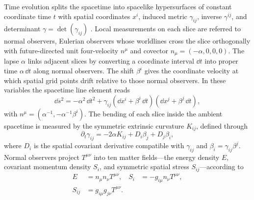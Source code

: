 Time evolution splits the spacetime into spacelike hypersurfaces of constant coordinate time $t$ with spatial coordinates $x^i$, induced metric $\gamma_{ij}$, inverse $\gamma^{ij}$, and determinant $\gamma = \det(\gamma_{ij})$ \cite{Arnowitt:1962hi}. Local measurements on each slice are referred to normal observers, Eulerian observers whose worldlines cross the slice orthogonally with future-directed unit four-velocity $n^\mu$ and covector $n_\mu = (-\alpha, 0, 0, 0)$. The lapse $\alpha$ links adjacent slices by converting a coordinate interval $\dd t$ into proper time $\alpha\,\dd t$ along normal observers. The shift $\beta^i$ gives the coordinate velocity at which spatial grid points drift relative to those normal observers. In these variables the spacetime line element reads
\begin{equation}\label{eq:line_element}
\dd s^2 = -\alpha^2\,\dd t^2 + \gamma_{ij}(\dd x^i + \beta^i\,\dd t)(\dd x^j + \beta^j\,\dd t),
\end{equation}
with $n^\mu = (\alpha^{-1}, -\alpha^{-1}\beta^i)$. The bending of each slice inside the ambient spacetime is measured by the symmetric extrinsic curvature $K_{ij}$, defined through
\begin{equation}\label{eq:extrinsic_curvature}
\partial_t \gamma_{ij} = -2\alpha K_{ij} + D_i \beta_j + D_j \beta_i,
\end{equation}
where $D_i$ is the spatial covariant derivative compatible with $\gamma_{ij}$ and $\beta_i = \gamma_{ij}\beta^j$. Normal observers project $T^{\mu\nu}$ into ten matter fields---the energy density $E$, covariant momentum density $S_i$, and symmetric spatial stress $S_{ij}$---according to
\begin{align}\label{eq:source_projections}
E &= n_\mu n_\nu T^{\mu\nu}, &
S_i &= -g_{i\mu} n_\nu T^{\mu\nu}, \nonumber\\
S_{ij} &= g_{i\mu} g_{j\nu} T^{\mu\nu}. & &
\end{align}

